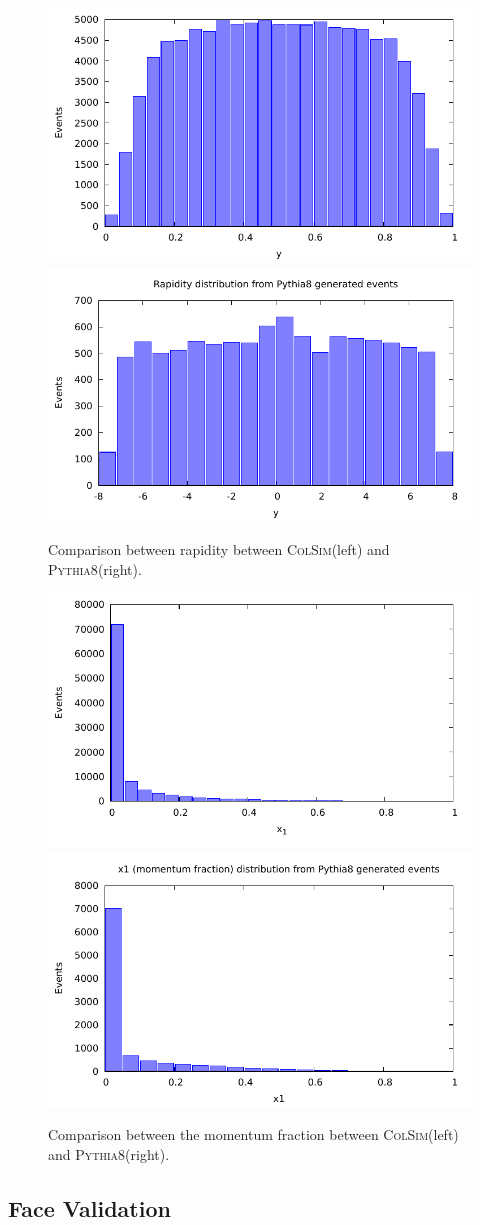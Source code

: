 \begin{figure}[ht]
  \centering
  \includegraphics[width=0.49\linewidth]{./res/gfx/y-colsim.pdf}
  \includegraphics[width=0.49\linewidth]{./res/gfx/y-pythia.pdf}
  \caption{Comparison between rapidity between \textsc{ColSim}(left) and \textsc{Pythia8}(right).}
  \label{fig:y}
\end{figure}

\begin{figure}[ht]
  \centering
  \includegraphics[width=0.49\linewidth]{./res/gfx/x1-colsim.pdf}
  \includegraphics[width=0.49\linewidth]{./res/gfx/x1-pythia.pdf}
  \caption{Comparison between the momentum fraction between \textsc{ColSim}(left) and \textsc{Pythia8}(right).}
  \label{fig:x1}
\end{figure}



\subsection{Face Validation}

